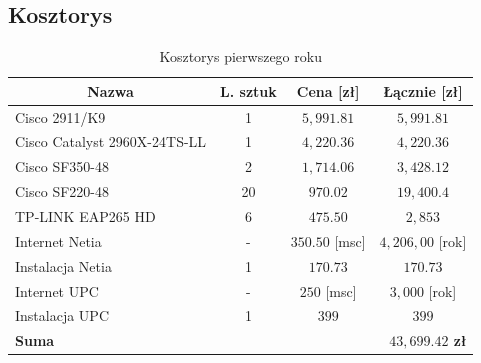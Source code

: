 \documentclass[a4paper,12pt]{extarticle}  %
\begin{document}
\subsection{Kosztorys}
\begin{table}[H]
	\centering
	\caption{Kosztorys pierwszego roku}
	\begin{tabular}{|llc|c|}
		\hline
		\multicolumn{1}{|c|}{\textbf{Nazwa}}               & \multicolumn{1}{c|}{\textbf{L. sztuk}} & \textbf{Cena [zł]}    & \textbf{Łącznie [zł]}                        \\ \hline
		\multicolumn{1}{|l|}{Cisco 2911/K9}                & \multicolumn{1}{c|}{1}                 & $5,991.81$            & $5,991.81$                                   \\ \hline
		\multicolumn{1}{|l|}{Cisco Catalyst 2960X-24TS-LL} & \multicolumn{1}{c|}{1}                 & $4,220.36$            & $4,220.36$                                   \\ \hline
		\multicolumn{1}{|l|}{Cisco SF350-48}               & \multicolumn{1}{c|}{2}                 & $1,714.06$            & $3,428.12$                                   \\ \hline
		\multicolumn{1}{|l|}{Cisco SF220-48}               & \multicolumn{1}{c|}{20}                & $970.02$              & $19,400.4$                                   \\ \hline
		\multicolumn{1}{|l|}{TP-LINK EAP265 HD}            & \multicolumn{1}{c|}{6}                 & $475.50$              & $2,853$                                      \\ \hline
		\multicolumn{1}{|l|}{Internet Netia}               & \multicolumn{1}{c|}{-}                 & $350.50$ [msc]        & $4,206,00$ [rok]                             \\ \hline
		\multicolumn{1}{|l|}{Instalacja Netia}             & \multicolumn{1}{c|}{1}                 & $170.73$              & $170.73$                                     \\ \hline
		\multicolumn{1}{|l|}{Internet UPC}                 & \multicolumn{1}{c|}{-}                 & $250$ [msc]           & $3,000$ [rok]                                \\ \hline
		\multicolumn{1}{|l|}{Instalacja UPC}               & \multicolumn{1}{c|}{1}                 & $399$                 & $399$                                        \\ \hline
		\textbf{Suma}                                      &                                        & \multicolumn{1}{l|}{} & \multicolumn{1}{r|}{\textbf{$43,699.42$ zł}} \\ \hline
	\end{tabular}
\end{table}
\end{document}
